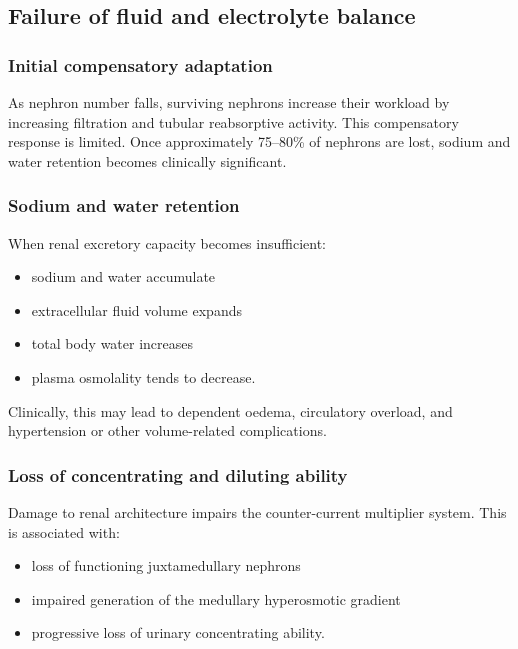 \documentclass[11pt,a4paper]{article}
\begin{document}
\subsection{Failure of fluid and electrolyte balance}

\subsubsection{Initial compensatory adaptation}

As nephron number falls, surviving nephrons increase their workload by increasing filtration and tubular reabsorptive activity. This compensatory response is limited. Once approximately 75--80\% of nephrons are lost, sodium and water retention becomes clinically significant.\cite{KamPowerRenalFailure}

\subsubsection{Sodium and water retention}

When renal excretory capacity becomes insufficient:
\begin{itemize}
  \item sodium and water accumulate
  \item extracellular fluid volume expands
  \item total body water increases
  \item plasma osmolality tends to decrease.
\end{itemize}

Clinically, this may lead to dependent oedema, circulatory overload, and hypertension or other volume-related complications.\cite{KamPowerRenalFailure}

\subsubsection{Loss of concentrating and diluting ability}

Damage to renal architecture impairs the counter-current multiplier system. This is associated with:
\begin{itemize}
  \item loss of functioning juxtamedullary nephrons
  \item impaired generation of the medullary hyperosmotic gradient
  \item progressive loss of urinary concentrating ability.
\end{itemize}
\end{document}

